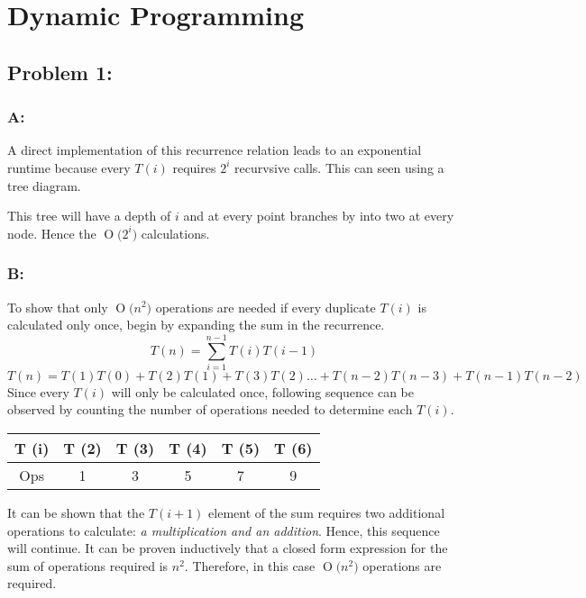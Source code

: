 \documentclass[12pt]{article}
\newcommand{\BigO}[1]{\ensuremath{\operatorname{O}\bigl(#1\bigr)}}
\begin{document}
\section*{Dynamic Programming}
\subsection*{Problem 1:}
\subsubsection*{A:}
A direct implementation of this recurrence relation leads to an exponential
runtime because every $T(i)$ requires $2^{i}$ recurvsive calls.  This can
seen using a tree diagram.\\ 
\begin{center}
\end{center}    
This tree will have a depth of $i$ and at every point branches by into 
two at every node.  Hence the \BigO{2^{i}} calculations. 
\subsubsection*{B:}
To show that only \BigO{n^2} operations are needed if every duplicate
$T(i)$ is calculated only once, begin by expanding the sum in the 
recurrence.
\[
T(n) = \sum_{i=1}^{n-1}T(i)T(i-1)
\]
\[ 
T(n) = T(1)T(0) + T(2)T(1) + T(3)T(2)\dots
+ T(n-2)T(n-3) + T(n-1)T(n-2)
\]
Since every $T(i)$ will only be calculated once, following sequence
can be observed by counting the number of operations needed to determine
each $T(i)$.

\begin{center}
    \begin{tabular}{c| c c c c c}
    T (i) & T (2) & T (3) & T (4) & T (5) & T (6) \\ \hline  
    Ops & 1 & 3 & 5 & 7 & 9 \\
    \end{tabular}
\end{center}
It can be shown that the $T(i+1)$ element of the sum requires two additional
operations to calculate: \textit{a multiplication and an addition}.  Hence,
this sequence will continue.  It can be proven inductively that a closed
form expression for the sum of operations required is $n^2$.  Therefore,
in this case \BigO{n^2} operations are required. 
\end{document}
